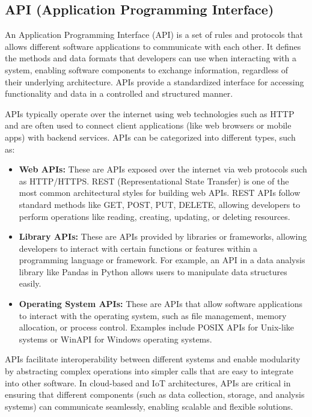 \subsection*{API (Application Programming Interface)}
\label{sec:api}

An Application Programming Interface (API) is a set of rules and protocols that allows different software applications to communicate with each other. It defines the methods and data formats that developers can use when interacting with a system, enabling software components to exchange information, regardless of their underlying architecture. APIs provide a standardized interface for accessing functionality and data in a controlled and structured manner.

APIs typically operate over the internet using web technologies such as HTTP and are often used to connect client applications (like web browsers or mobile apps) with backend services. APIs can be categorized into different types, such as:

\begin{itemize}
    \item \textbf{Web APIs:} These are APIs exposed over the internet via web protocols such as HTTP/HTTPS. REST (Representational State Transfer) is one of the most common architectural styles for building web APIs. REST APIs follow standard methods like GET, POST, PUT, DELETE, allowing developers to perform operations like reading, creating, updating, or deleting resources.
    
    \item \textbf{Library APIs:} These are APIs provided by libraries or frameworks, allowing developers to interact with certain functions or features within a programming language or framework. For example, an API in a data analysis library like Pandas in Python allows users to manipulate data structures easily.

    \item \textbf{Operating System APIs:} These are APIs that allow software applications to interact with the operating system, such as file management, memory allocation, or process control. Examples include POSIX APIs for Unix-like systems or WinAPI for Windows operating systems.
\end{itemize}

APIs facilitate interoperability between different systems and enable modularity by abstracting complex operations into simpler calls that are easy to integrate into other software. In cloud-based and IoT architectures, APIs are critical in ensuring that different components (such as data collection, storage, and analysis systems) can communicate seamlessly, enabling scalable and flexible solutions.

